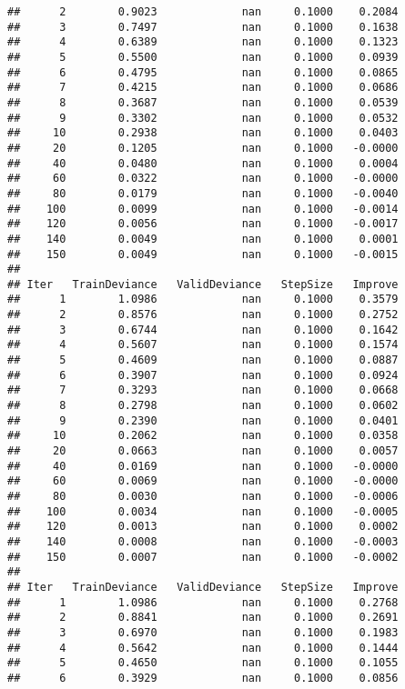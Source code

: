 \documentclass[
]{article}
\begin{document}
\begin{verbatim}
##      2        0.9023             nan     0.1000    0.2084
##      3        0.7497             nan     0.1000    0.1638
##      4        0.6389             nan     0.1000    0.1323
##      5        0.5500             nan     0.1000    0.0939
##      6        0.4795             nan     0.1000    0.0865
##      7        0.4215             nan     0.1000    0.0686
##      8        0.3687             nan     0.1000    0.0539
##      9        0.3302             nan     0.1000    0.0532
##     10        0.2938             nan     0.1000    0.0403
##     20        0.1205             nan     0.1000   -0.0000
##     40        0.0480             nan     0.1000    0.0004
##     60        0.0322             nan     0.1000   -0.0000
##     80        0.0179             nan     0.1000   -0.0040
##    100        0.0099             nan     0.1000   -0.0014
##    120        0.0056             nan     0.1000   -0.0017
##    140        0.0049             nan     0.1000    0.0001
##    150        0.0049             nan     0.1000   -0.0015
## 
## Iter   TrainDeviance   ValidDeviance   StepSize   Improve
##      1        1.0986             nan     0.1000    0.3579
##      2        0.8576             nan     0.1000    0.2752
##      3        0.6744             nan     0.1000    0.1642
##      4        0.5607             nan     0.1000    0.1574
##      5        0.4609             nan     0.1000    0.0887
##      6        0.3907             nan     0.1000    0.0924
##      7        0.3293             nan     0.1000    0.0668
##      8        0.2798             nan     0.1000    0.0602
##      9        0.2390             nan     0.1000    0.0401
##     10        0.2062             nan     0.1000    0.0358
##     20        0.0663             nan     0.1000    0.0057
##     40        0.0169             nan     0.1000   -0.0000
##     60        0.0069             nan     0.1000   -0.0000
##     80        0.0030             nan     0.1000   -0.0006
##    100        0.0034             nan     0.1000   -0.0005
##    120        0.0013             nan     0.1000    0.0002
##    140        0.0008             nan     0.1000   -0.0003
##    150        0.0007             nan     0.1000   -0.0002
## 
## Iter   TrainDeviance   ValidDeviance   StepSize   Improve
##      1        1.0986             nan     0.1000    0.2768
##      2        0.8841             nan     0.1000    0.2691
##      3        0.6970             nan     0.1000    0.1983
##      4        0.5642             nan     0.1000    0.1444
##      5        0.4650             nan     0.1000    0.1055
##      6        0.3929             nan     0.1000    0.0856

\end{verbatim}
\end{document}
